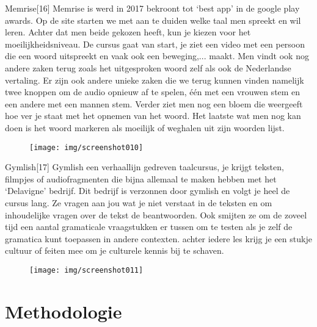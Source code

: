 \documentclass{hogent-article}
\begin{document}
Memrise[16]
Memrise is werd in 2017 bekroont tot ‘best app’ in de google play awards. Op de site starten we met aan te duiden welke taal men spreekt en wil leren. Achter dat men beide gekozen heeft, kun je kiezen voor het moeilijkheidsniveau. De cursus gaat van start, je ziet een video met een persoon die een woord uitspreekt en vaak ook een beweging,... maakt. Men vindt ook nog andere zaken terug zoals het uitgesproken woord zelf als ook de Nederlandse vertaling. Er zijn ook andere unieke zaken die we terug kunnen vinden namelijk twee knoppen om de audio opnieuw af te spelen, één met een vrouwen stem en een andere met een mannen stem. Verder ziet men nog een bloem die weergeeft hoe ver je staat met het opnemen van het woord. Het laatste wat men nog kan doen is het woord markeren als moeilijk of weghalen uit zijn woorden lijst.  

\begin{figure}
    \centering
    \texttt{[image: img/screenshot010]}
    \caption{}
    \label{fig:screenshot010}
\end{figure}

Gymlish[17]
Gymlish een verhaallijn gedreven taalcursus, je krijgt teksten, filmpjes of audiofragmenten die bijna allemaal te maken hebben met het ‘Delavigne’ bedrijf. Dit bedrijf is verzonnen door gymlish en volgt je heel de cursus lang. Ze vragen aan jou wat je niet verstaat in de teksten en om inhoudelijke vragen over de tekst de beantwoorden. Ook smijten ze om de zoveel tijd een aantal gramaticale vraagstukken er tussen om te testen als je zelf de gramatica kunt toepassen in andere contexten. achter iedere les krijg je een stukje cultuur of feiten mee om je culturele kennis bij te schaven.

\begin{figure}
    \centering
    \texttt{[image: img/screenshot011]}
    \caption{}
    \label{fig:screenshot011}
\end{figure}


\section{Methodologie}

\end{document}
